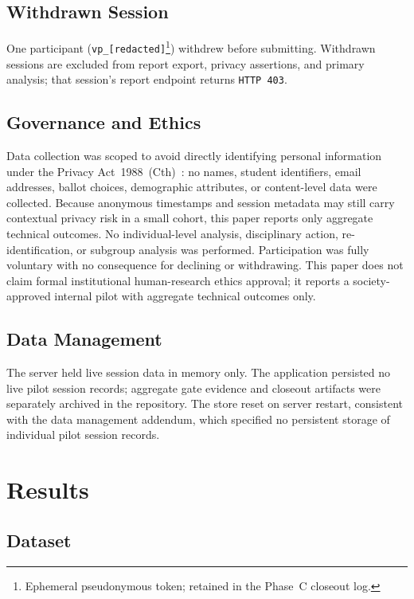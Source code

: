 \documentclass[conference]{IEEEtran}
\begin{document}
\subsection{Withdrawn Session}

One participant (\texttt{vp\_[redacted]}\footnote{Ephemeral pseudonymous token;
retained in the Phase~C closeout log.}) withdrew before submitting.
Withdrawn sessions are excluded from report export, privacy assertions, and
primary analysis; that session's report endpoint returns \texttt{HTTP~403}.

\subsection{Governance and Ethics}

Data collection was scoped to avoid directly identifying personal information
under the Privacy Act~1988~(Cth)~\cite{privacyact1988}: no names, student
identifiers, email addresses, ballot choices, demographic attributes, or
content-level data were collected. Because anonymous timestamps and session
metadata may still carry contextual privacy risk in a small cohort, this paper
reports only aggregate technical outcomes. No individual-level analysis,
disciplinary action, re-identification, or subgroup analysis was performed.
Participation was fully voluntary with no consequence for declining or
withdrawing. This paper does not claim formal institutional human-research ethics
approval; it reports a society-approved internal pilot with aggregate technical
outcomes only.

\subsection{Data Management}

The server held live session data in memory only. The application persisted no
live pilot session records; aggregate gate evidence and closeout artifacts were
separately archived in the repository. The store reset on server
restart, consistent with the data management addendum, which specified no
persistent storage of individual pilot session records.

\section{Results}
\label{sec:results}

\subsection{Dataset}
\end{document}
